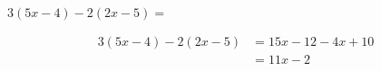 $3(5x - 4) - 2(2x - 5) =$

\begin{solutionbox}{2.5cm}
    \begin{align*}
        3(5x - 4) - 2(2x - 5) & =15x-12 - 4x+10 \\
                              & =11x-2
    \end{align*}
\end{solutionbox}
